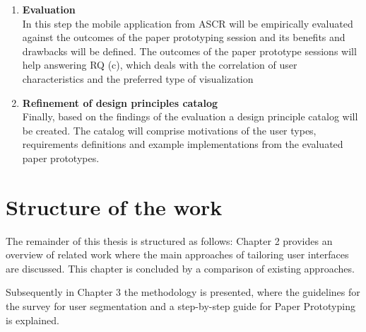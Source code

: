 \begin{enumerate}
%	
	
	\item \textbf{Evaluation} \\
	In this step the mobile application from ASCR will be empirically evaluated against the outcomes of the paper prototyping session and its benefits and drawbacks will be defined. The outcomes of the paper prototype sessions will help answering RQ (c), which deals with the correlation of user characteristics and the preferred type of visualization 
	
	\item \textbf{Refinement of design principles catalog} \\
	Finally, based on the findings of the evaluation a design principle catalog will be created. The catalog will comprise motivations of the user types, requirements definitions and example implementations from the evaluated paper prototypes.
	
\end{enumerate}


\section{Structure of the work} 
The remainder of this thesis is structured as follows:  Chapter 2 provides an overview of related work where the main approaches of tailoring user interfaces are discussed. This chapter is concluded by a comparison of existing approaches.

Subsequently in Chapter 3 the methodology is presented, where the guidelines for the survey for user segmentation and a step-by-step guide for Paper Prototyping is explained.
%
%

